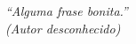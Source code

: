 \begin{epigrafe}
    \vspace*{\fill}
	\begin{flushright}
		\textit{``Alguma frase bonita.''\\
		(Autor desconhecido)}
	\end{flushright}
\end{epigrafe}
